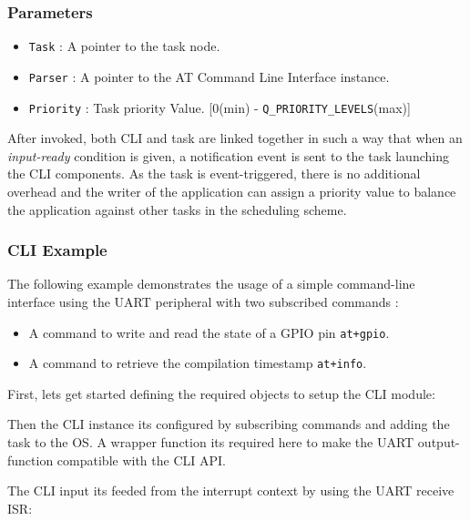 \subsubsection*{Parameters}
\begin{itemize}
    \item \lstinline{Task} : A pointer to the task node. 
    \item \lstinline{Parser} :  A pointer to the AT Command Line Interface instance.
    \item \lstinline{Priority} : Task priority Value. [0(min) - \lstinline{Q_PRIORITY_LEVELS}(max)]
\end{itemize}

After invoked, both CLI and task are linked together in such a way that when an \textit{input-ready} condition is given, a notification event is sent to the task launching the CLI components. As the task is event-triggered, there is no additional overhead and the writer of the application can assign a priority value to balance the application against other tasks in the scheduling scheme.

\subsubsection{CLI Example}

The following example demonstrates the usage of a simple command-line interface using the UART peripheral with two subscribed commands :

\begin{itemize}
    \item A command to write and read the state of a GPIO pin \lstinline{at+gpio}.
    \item A command to retrieve the compilation timestamp \lstinline{at+info}.
\end{itemize}

First, lets get started defining the required objects to setup the CLI module:
\medskip



Then the CLI instance its configured by subscribing commands and adding the task to the OS. A wrapper function its required here to make the UART output-function compatible with the CLI API.



The CLI input its feeded from the interrupt context by using the UART receive ISR:

